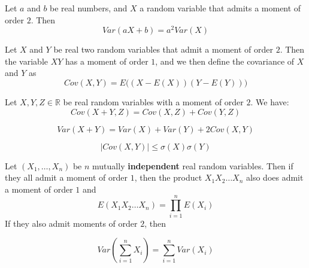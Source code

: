 \documentclass[
10pt, %
a4paper, %
oneside, %
headinclude,footinclude, %
BCOR5mm, %
]{scrartcl}
\begin{document}
\begin{proposition}
    \label{prop:var}

    Let $a$ and $b$ be real numbers, and $X$ a random variable that admits a moment of order $2$. Then
    \begin{equation}
	Var(aX+b)=a^2Var(X)
    \end{equation}

\end{proposition}

\begin{proposition}
    Let $X$ and $Y$ be real two random variables that admit a moment of order $2$. Then the variable $XY$ has a moment of order $1$, and we then define the covariance of $X$ and $Y$ as
    \begin{equation*}
	Cov(X,Y) = E\big( (X-E(X))(Y-E(Y))\big)
    \end{equation*}
\end{proposition}
    

\begin{lemma}
    Let $X, Y, Z\in \mathbb{R} $ be real random variables with a moment of order $2$. We have:
\begin{equation*}
    Cov(X+Y, Z) = Cov(X,Z)+Cov(Y,Z)
\end{equation*}

\begin{equation*}
    Var(X+Y) = Var(X)+Var(Y)+2Cov(X,Y)
\end{equation*}

\begin{equation*}
    |Cov(X,Y)|\leq \sigma(X)\sigma(Y)
\end{equation*}
\end{lemma}

\begin{proposition}
    Let $(X_1, \dots, X_n)$ be $n$ mutually \textbf{{independent}}  real random variables. Then if they all admit a moment of order $1$, then the product $X_1X_2\dots X_n$ also does admit a moment of order $1$ and 
    \begin{equation}
	E(X_1X_2\dots X_n) = \prod^{n}_{i=1} E(X_i)
    \end{equation}
    If they also admit moments of order $2$, then
    
    \begin{equation}
	Var( \sum^{n}_{i=1} X_i ) = \sum^{n}_{i=1} Var(X_i)
    \end{equation}
\end{proposition}
\end{document}
